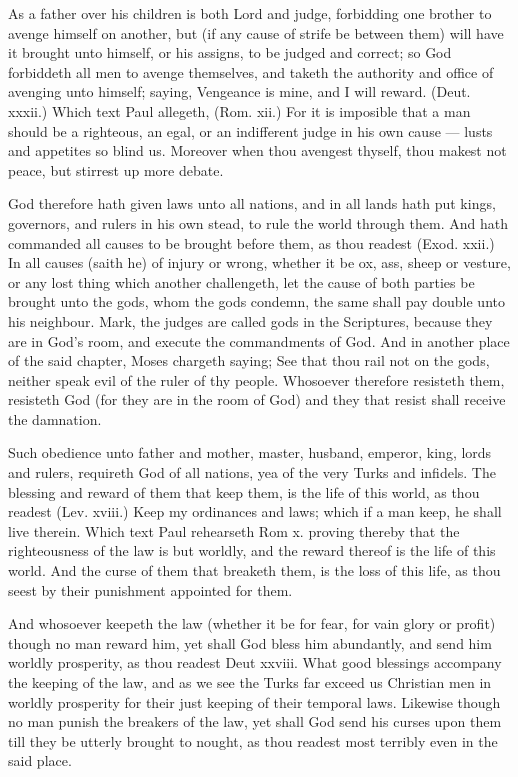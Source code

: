 As a father over his children is both Lord and judge, 
forbidding one brother to avenge himself on another, but
(if any cause of strife be between them) will have it 
brought unto himself, or his assigns, to be judged and 
correct; so God forbiddeth all men to avenge themselves,
and taketh the authority and office of avenging unto 
himself; saying, Vengeance is mine, and I will reward. 
(Deut. xxxii.) Which text Paul allegeth, (Rom. xii.) 
For it is imposible that a man should be a righteous, an 
egal, or an indifferent judge in his own cause — lusts and 
appetites so blind us. Moreover when thou avengest 
thyself, thou makest not peace, but stirrest up more 
debate. 

God therefore hath given laws unto all nations, and in 
all lands hath put kings, governors, and rulers in his own 
stead, to rule the world through them. And hath commanded
all causes to be brought before them, as thou readest 
(Exod. xxii.) In all causes (saith he) of injury or wrong, 
whether it be ox, ass, sheep or vesture, or any lost thing 
which another challengeth, let the cause of both parties be 
brought unto the gods, whom the gods condemn, the 
same shall pay double unto his neighbour. Mark, the 
judges are called gods in the Scriptures, because they are 
in God's room, and execute the commandments of God. 
And in another place of the said chapter, Moses chargeth 
saying; See that thou rail not on the gods, neither speak 
evil of the ruler of thy people. Whosoever therefore resisteth
them, resisteth God (for they are in the room of 
God) and they that resist shall receive the damnation. 

Such obedience unto father and mother, master, 
husband, emperor, king, lords and rulers, requireth God 
of all nations, yea of the very Turks and infidels. The 
blessing and reward of them that keep them, is the life of 
this world, as thou readest (Lev. xviii.) Keep my ordinances
and laws; which if a man keep, he shall live 
therein. Which text Paul rehearseth Rom x. proving 
thereby that the righteousness of the law is but worldly, 
and the reward thereof is the life of this world. And the 
curse of them that breaketh them, is the loss of this life, 
as thou seest by their punishment appointed for them.

And whosoever keepeth the law (whether it be for fear, 
for vain glory or profit) though no man reward him, yet 
shall God bless him abundantly, and send him worldly 
prosperity, as thou readest Deut xxviii. What good 
blessings accompany the keeping of the law, and as we 
see the Turks far exceed us Christian men in worldly prosperity
for their just keeping of their temporal laws. Likewise
though no man punish the breakers of the law, yet 
shall God send his curses upon them till they be utterly 
brought to nought, as thou readest most terribly even in 
the said place.

